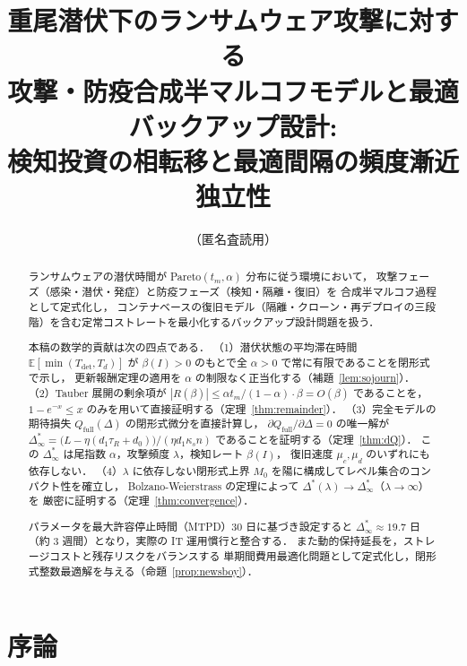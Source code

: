 \documentclass[12pt,a4paper]{article}
\theoremstyle{plain}
\theoremstyle{definition}
\theoremstyle{remark}
\newcommand{\E}{\mathbb{E}}
\newcommand{\Qf}{Q_{\mathrm{full}}}
\newcommand{\Tdet}{T_{\mathrm{det}}}
\newcommand{\betaI}{\beta(I)}
\newcommand{\Dopt}{\Delta^{*}}
\newcommand{\Dinf}{\Delta^{*}_{\infty}}
\begin{document}
\title{重尾潜伏下のランサムウェア攻撃に対する\\
攻撃・防疫合成半マルコフモデルと最適バックアップ設計:\\
検知投資の相転移と最適間隔の頻度漸近独立性}
\author{（匿名査読用）}
\date{}
\maketitle

\begin{abstract}
ランサムウェアの潜伏時間が Pareto$(t_m,\alpha)$ 分布に従う環境において，
攻撃フェーズ（感染・潜伏・発症）と防疫フェーズ（検知・隔離・復旧）を
合成半マルコフ過程として定式化し，
コンテナベースの復旧モデル（隔離・クローン・再デプロイの三段階）を含む定常コストレートを最小化するバックアップ設計問題を扱う．

本稿の数学的貢献は次の四点である．
（1）潜伏状態の平均滞在時間 $\E[\min(\Tdet,T_d)]$ が
$\betaI>0$ のもとで全 $\alpha>0$ で常に有限であることを閉形式で示し，
更新報酬定理の適用を $\alpha$ の制限なく正当化する（補題~\ref{lem:sojourn}）．
（2）Tauber 展開の剰余項が $|R(\beta)|\le\alpha t_m/(1-\alpha)\cdot\beta=O(\beta)$
であることを，$1-e^{-x}\le x$ のみを用いて直接証明する（定理~\ref{thm:remainder}）．
（3）完全モデルの期待損失 $\Qf(\Delta)$ の閉形式微分を直接計算し，
$\partial\Qf/\partial\Delta=0$ の唯一解が
$\Dinf=\bigl(L-\eta(d_1\tau_R+d_0)\bigr)/(\eta d_1\kappa_s n)$
であることを証明する（定理~\ref{thm:dQ}）．
この $\Dinf$ は尾指数 $\alpha$，攻撃頻度 $\lambda$，検知レート $\betaI$，
復旧速度 $\mu_c,\mu_d$ のいずれにも依存しない．
（4）$\lambda$ に依存しない閉形式上界 $M_0$ を陽に構成してレベル集合のコンパクト性を確立し，
Bolzano-Weierstrass の定理によって $\Dopt(\lambda)\to\Dinf$（$\lambda\to\infty$）を
厳密に証明する（定理~\ref{thm:convergence}）．

パラメータを最大許容停止時間（MTPD）30 日に基づき設定すると
$\Dinf\approx19.7$ 日（約 3 週間）となり，実際の IT 運用慣行と整合する．
また動的保持延長を，ストレージコストと残存リスクをバランスする
単期間費用最適化問題として定式化し，閉形式整数最適解を与える（命題~\ref{prop:newsboy}）．
\end{abstract}

\tableofcontents
\newpage

\section{序論}
\label{sec:intro}
\end{document}
